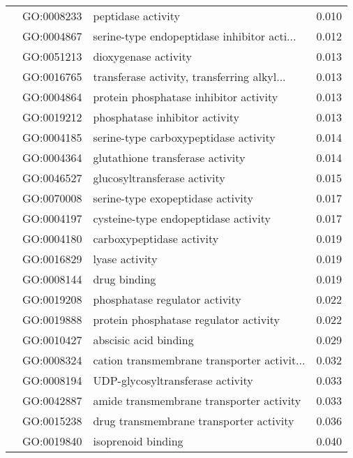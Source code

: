 \begin{longtable}{lllr}
   & GO:0008233 &                           peptidase activity &         0.010 \\
   & GO:0004867 &  serine-type endopeptidase inhibitor acti... &         0.012 \\
   & GO:0051213 &                         dioxygenase activity &         0.013 \\
   & GO:0016765 &  transferase activity, transferring alkyl... &         0.013 \\
   & GO:0004864 &       protein phosphatase inhibitor activity &         0.013 \\
   & GO:0019212 &               phosphatase inhibitor activity &         0.013 \\
   & GO:0004185 &        serine-type carboxypeptidase activity &         0.014 \\
   & GO:0004364 &             glutathione transferase activity &         0.014 \\
   & GO:0046527 &                 glucosyltransferase activity &         0.015 \\
   & GO:0070008 &            serine-type exopeptidase activity &         0.017 \\
   & GO:0004197 &         cysteine-type endopeptidase activity &         0.017 \\
   & GO:0004180 &                    carboxypeptidase activity &         0.019 \\
   & GO:0016829 &                               lyase activity &         0.019 \\
   & GO:0008144 &                                 drug binding &         0.019 \\
   & GO:0019208 &               phosphatase regulator activity &         0.022 \\
   & GO:0019888 &       protein phosphatase regulator activity &         0.022 \\
   & GO:0010427 &                        abscisic acid binding &         0.029 \\
   & GO:0008324 &  cation transmembrane transporter activit... &         0.032 \\
   & GO:0008194 &             UDP-glycosyltransferase activity &         0.033 \\
   & GO:0042887 &     amide transmembrane transporter activity &         0.033 \\
   & GO:0015238 &      drug transmembrane transporter activity &         0.036 \\
   & GO:0019840 &                           isoprenoid binding &         0.040 \\

\end{longtable}
